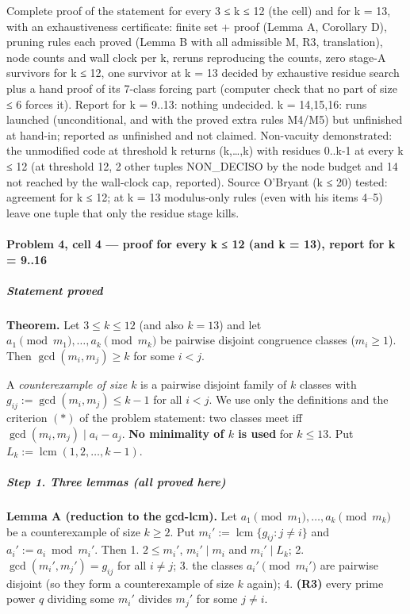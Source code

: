
Complete proof of the statement for every 3 ≤ k ≤ 12 (the cell) and for
k = 13, with an exhaustiveness certificate: finite set + proof (Lemma A,
Corollary D), pruning rules each proved (Lemma B with all admissible M,
R3, translation), node counts and wall clock per k, reruns reproducing
the counts, zero stage-A survivors for k ≤ 12, one survivor at k = 13
decided by exhaustive residue search plus a hand proof of its 7-class
forcing part (computer check that no part of size ≤ 6 forces it). Report
for k = 9..13: nothing undecided. k = 14,15,16: runs launched
(unconditional, and with the proved extra rules M4/M5) but unfinished at
hand-in; reported as unfinished and not claimed. Non-vacuity
demonstrated: the unmodified code at threshold k returns (k,\ldots,k)
with residues 0..k-1 at every k ≤ 12 (at threshold 12, 2 other tuples
NON\_DECISO by the node budget and 14 not reached by the wall-clock cap,
reported). Source O'Bryant (k ≤ 20) tested: agreement for k ≤ 12; at k =
13 modulus-only rules (even with his items 4--5) leave one tuple that
only the residue stage kills.


\paragraph{Problem 4, cell 4 --- proof for every k ≤ 12 (and k = 13),
report for k =
9..16}\label{problem-4-cell-4-proof-for-every-k-12-and-k-13-report-for-k-9..16}

\subparagraph{Statement proved}\label{statement-proved}

\textbf{Theorem.} Let \(3\le k\le 12\) (and also \(k=13\)) and let
\(a_1 \pmod{m_1},\dots,a_k\pmod{m_k}\) be pairwise disjoint congruence
classes (\(m_i\ge1\)). Then \(\gcd(m_i,m_j)\ge k\) for some \(i<j\).

A \emph{counterexample of size \(k\)} is a pairwise disjoint family of
\(k\) classes with \(g_{ij}:=\gcd(m_i,m_j)\le k-1\) for all \(i<j\). We
use only the definitions and the criterion \((*)\) of the problem
statement: two classes meet iff \(\gcd(m_i,m_j)\mid a_i-a_j\).
\textbf{No minimality of \(k\) is used} for \(k\le13\). Put
\(L_k:=\operatorname{lcm}(1,2,\dots,k-1)\).

\subparagraph{Step 1. Three lemmas (all proved
here)}\label{step-1.-three-lemmas-all-proved-here}

\textbf{Lemma A (reduction to the gcd-lcm).} Let
\(a_1\pmod{m_1},\dots,a_k\pmod{m_k}\) be a counterexample of size
\(k\ge2\). Put \(m_i':=\operatorname{lcm}\{g_{ij}: j\ne i\}\) and
\(a_i':=a_i \bmod m_i'\). Then 1. \(2\le m_i'\), \(m_i'\mid m_i\) and
\(m_i'\mid L_k\); 2. \(\gcd(m_i',m_j')=g_{ij}\) for all \(i\ne j\); 3.
the classes \(a_i'\pmod{m_i'}\) are pairwise disjoint (so they form a
counterexample of size \(k\) again); 4. \textbf{(R3)} every prime power
\(q\) dividing some \(m_i'\) divides \(m_j'\) for some \(j\ne i\).

